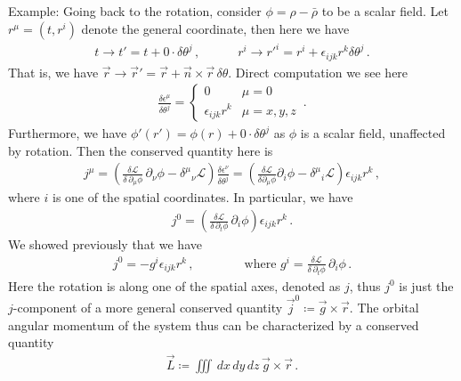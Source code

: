\documentclass[11pt, onesided]{book}
\theoremstyle{break}
\theoremstyle{break}
\newcommand{\pd}{\partial}
\newcommand{\example}{\color{green}Example: \color{black}}
\begin{document}
\example Going back to the rotation, consider $\phi = \rho  - \bar{\rho}$ to be a scalar field. Let $r^\mu = (t, r^i)$ denote the general coordinate, then here we have
\begin{align*}
t\to t' = t+0\cdot \delta \theta^j\,,\qquad\quad r^i \to r'^i = r^i + \epsilon_{ijk}r^k \delta \theta^j\,.
\end{align*}
That is, we have $\vec{r} \to \vec{r}' =\vec{r} + \vec{n}\times \vec{r}\, \delta \theta$. Direct computation we see here
\begin{align*}
\frac{\delta \epsilon^\mu}{\delta \theta^j} = \begin{cases}
0 & \mu = 0\\
\epsilon_{ijk}r^k & \mu = x,y,z
\end{cases}\,.
\end{align*}
Furthermore, we have $\phi'(r') = \phi(r) + 0 \cdot \delta \theta^j$ as $\phi$ is a scalar field, unaffected by rotation. Then the conserved quantity here is 
\begin{align*}
j^\mu = \left( \frac{\delta \mathcal{L}}{\delta \, \pd_\mu\phi} \,\pd_\nu \phi - \delta^\mu{}_\nu \mathcal{L}\right) \frac{\delta \epsilon^\nu}{\delta \theta^j} =\left( \frac{\delta \mathcal{L}}{\delta \pd_\mu \phi}\pd_i \phi - \delta^\mu{}_i \mathcal{L}\right) \epsilon_{ijk}r^k \,,
\end{align*}
where $i$ is one of the spatial coordinates. In particular, we have
\begin{align*}
j^0 = \left( \frac{\delta \mathcal{L}}{\delta \, \pd_t \phi}\, \pd_i \phi\right) \epsilon_{ijk}r^k\,.
\end{align*}
We showed previously that we have
\begin{align*}
j^0 = -g^i \epsilon_{ijk}r^k\,,\qquad\qquad \text{where }g^i = \frac{\delta \mathcal{L}}{\delta \, \pd_t \phi}\, \pd_i \phi\,.
\end{align*}
Here the rotation is along one of the spatial axes, denoted as $j$, thus $j^0$ is just the $j$-component of a more general conserved quantity $\vec{j}^0 \coloneqq \vec{g}\times \vec{r}$. The orbital angular momentum of the system thus can be characterized by a conserved quantity
\begin{align*}
\vec{L} \coloneqq \iiint \, dx\,dy\, dz\, \vec{g}\times \vec{r}\,.
\end{align*}
\end{document}
